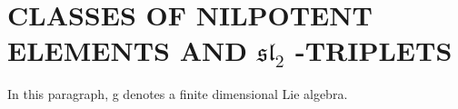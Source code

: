 \section{\texorpdfstring{CLASSES OF NILPOTENT ELEMENTS AND \(\mathfrak{sl}_2\) -TRIPLETS}{CLASSES OF NILPOTENT ELEMENTS AND \textbackslash mathfrak\{sl\}\_2 -TRIPLETS}}

In this paragraph, g denotes a finite dimensional Lie algebra.

